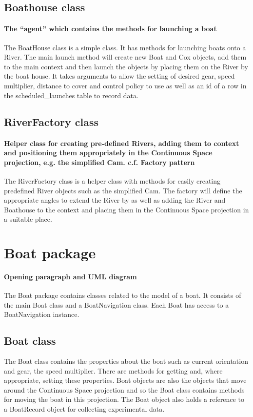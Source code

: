 \subsection{Boathouse class}
\paragraph{The ``agent'' which contains the methods for launching a boat}
The BoatHouse class is a simple class. It has methods for launching
boats onto a River. The main launch method will create new Boat and
Cox objects, add them to the main context and then launch the objects
by placing them on the River by the boat house. It takes arguments to
allow the setting of desired gear, speed multiplier, distance to
cover and control policy to use as well as an id of a row in the
scheduled\_launches table to record data.

\subsection{RiverFactory class}
\paragraph{Helper class for creating pre-defined Rivers, adding them
  to context and positioning them appropriately in the Continuous
  Space projection, e.g. the simplified Cam. c.f. Factory pattern}
The RiverFactory class is a helper class with methods for easily creating
predefined River objects such as the simplified Cam. The factory will
define the appropriate angles to extend the River by as well as adding
the River and Boathouse to the context and placing them in the
Continuous Space projection in a suitable place.

\section{Boat package}
\paragraph{Opening paragraph and UML diagram}
The Boat package contains classes related to the model of a boat. It
consists of the main Boat class and a BoatNavigation class. Each Boat
has access to a BoatNavigation instance.

\subsection{Boat class}
The Boat class contains the properties about the boat such as current
orientation and gear, the speed multiplier. There are methods for
getting and, where appropriate, setting these properties. Boat objects are also the
objects that move around the Continuous Space projection and so the
Boat class contains methods for moving the boat in this
projection. The Boat object also holds a reference to a BoatRecord
object for collecting experimental data.

